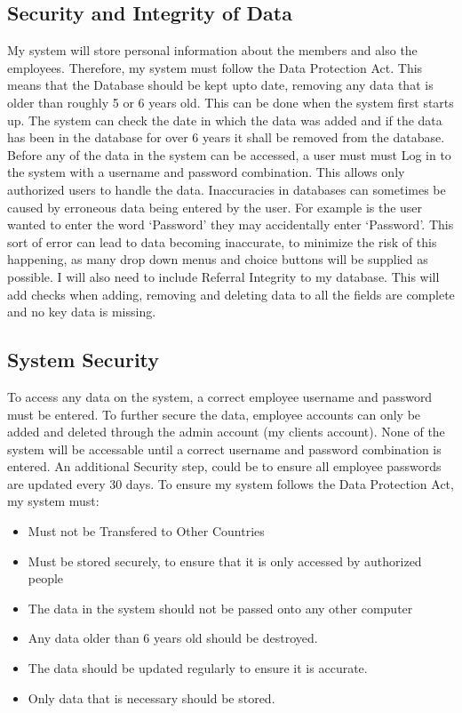 \subsection{Security and Integrity of Data}

My system will store personal information about the members and also the employees. Therefore, my system must follow the Data Protection Act. This means that the Database should be kept upto date, removing any data that is older than roughly 5 or 6 years old. This can be done when the system first starts up. The system can check the date in which the data was added and if the data has been in the database for over 6 years it shall be removed from the database. Before any of the data in the system can be accessed, a user must must Log in to the system with a username and password combination. This allows only authorized users to handle the data. Inaccuracies in databases can sometimes be caused by erroneous data being entered by the user. For example is the user wanted to enter the word `Password' they may accidentally enter `Password'. This sort of error can lead to data becoming inaccurate, to minimize the risk of this happening, as many drop down menus and choice buttons will be supplied as possible. I will also need to include Referral Integrity to my database. This will add checks when adding, removing and deleting data to all the fields are complete and no key data is missing.

\subsection{System Security}
To access any data on the system, a correct employee username and password must be entered. To further secure the data, employee accounts can only be added and deleted through the admin account (my clients account). None of the system will be accessable until a correct username and password combination is entered. An additional Security step, could be to ensure all employee passwords are updated every 30 days. To ensure my system follows the Data Protection Act, my system must: \par \par
\begin{itemize}
\item Must not be Transfered to Other Countries
\item Must be stored securely, to ensure that it is only accessed by authorized people
\item The data in the system should not be passed onto any other computer
\item Any data older than 6 years old should be destroyed.
\item The data should be updated regularly to ensure it is accurate.
\item Only data that is necessary should be stored.
\end{itemize}
